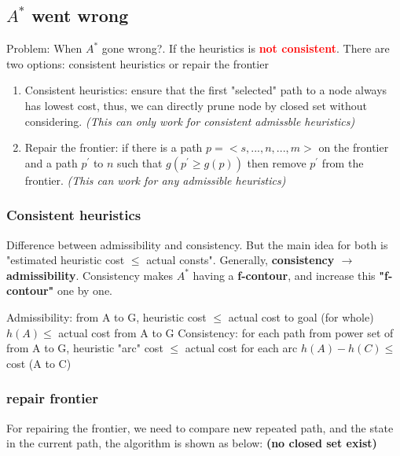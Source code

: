\subsection{$A^{*}$ went wrong}
\noindent
Problem: When $A^{*}$ gone wrong?. If the heuristics is \textbf{\textcolor{red}{not consistent}}. There are two options: consistent heuristics or repair the frontier
\begin{enumerate}
    \item Consistent heuristics: ensure that the first "selected" path to a node always has lowest cost, thus, we can directly prune node by closed set without considering. \emph{(This can only work for consistent admissble heuristics)}
    \item Repair the frontier: if there is a path $p = <s,...,n,...,m>$ on the frontier and a path $p^{\prime}$ to $n$ such that $g(p^{\prime} \ge g(p))$ then remove $p^{\prime}$ from the frontier. \emph{(This can work for any admissible heuristics)}
\end{enumerate}

\subsubsection{Consistent heuristics}
\noindent
Difference between admissibility and consistency. But the main idea for both is "estimated heuristic cost $\le$ actual consts". Generally, \textbf{consistency $\rightarrow$ admissibility}. Consistency makes $A^{*}$ having a \textbf{f-contour}, and increase this \textbf{"f-contour"} one by one.
\begin{outline}
    \1 Admissibility: from A to G, heuristic cost $\le$ actual cost to goal (for whole)
        \2 $h(A) \le$ actual cost from A to G
    \1 Consistency: for each path from power set of from A to G, heuristic "arc" cost $\le$ actual cost for each arc
        \2 $h(A) - h(C) \le$ cost (A to C)
\end{outline}

\subsubsection{repair frontier}
For repairing the frontier, we need to compare new repeated path, and the state in the current path, the algorithm is shown as below: \textbf{(no closed set exist)} \\

